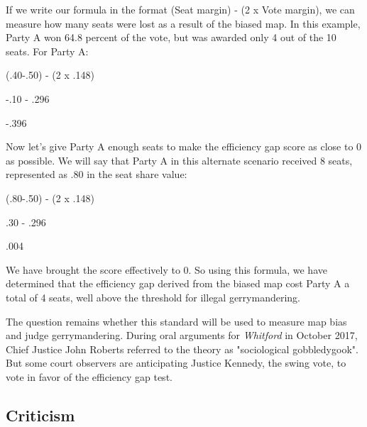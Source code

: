 \documentclass[sigconf]{acmart}
\begin{document}
If we write our formula in the format (Seat margin) - (2 x Vote margin), we can measure how many seats were lost as a result of the biased map. In this example, Party A won 64.8 percent of the vote, but was awarded only 4 out of the 10 seats. For Party A:

\begin{center}
    (.40-.50) - (2 x .148)
    
    -.10 - .296
    
    -.396
\end{center}

Now let's give Party A enough seats to make the efficiency gap score as close to 0 as possible. We will say that Party A in this alternate scenario received 8 seats, represented as .80 in the seat share value:

\begin{center}
    (.80-.50) - (2 x .148)
    
    .30 - .296
    
    .004
\end{center}

We have brought the score effectively to 0. So using this formula, we have determined that the efficiency gap derived from the biased map cost Party A a total of 4 seats, well above the threshold for illegal gerrymandering.

The question remains whether this standard will be used to measure map bias and judge gerrymandering. During oral arguments for \textit{Whitford} in October 2017, Chief Justice John Roberts referred to the theory as "sociological gobbledygook".\cite{gilltranscript} But some court observers are anticipating Justice Kennedy, the swing vote, to vote in favor of the efficiency gap test.\cite{analysis}

\subsection{Criticism}
\end{document}
